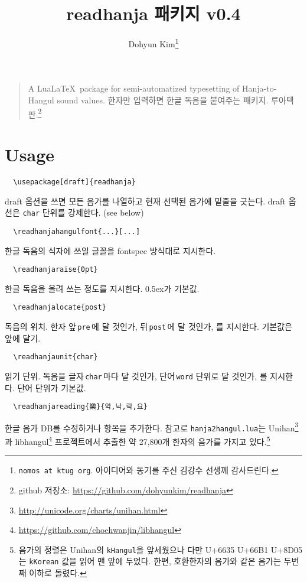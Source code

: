 \documentclass[b5paper]{article}
\begin{document}
\title{\ttfamily readhanja 패키지 v0.4}
\author{Dohyun Kim\thanks{\texttt{nomos at ktug org}.
  아이디어와 동기를 주신 김강수 선생께 감사드린다.}}
\maketitle

\begin{quote}
A Lua\LaTeX\ package for semi-automatized typesetting of
Hanja-to-Hangul sound values.
한자만 입력하면 한글 독음을 붙여주는 패키지. 루아텍 판.\footnote{
  github 저장소: \url{https://github.com/dohyunkim/readhanja}}
\end{quote}

\section*{Usage}

\begin{verbatim}
  \usepackage[draft]{readhanja}
\end{verbatim}
draft 옵션을 쓰면 모든 음가를 나열하고 현재 선택된 음가에
밑줄을 긋는다. draft 옵션은 \verb|char| 단위를 강제한다. (see below)

\begin{verbatim}
  \readhanjahangulfont{...}[...]
\end{verbatim}
한글 독음의 식자에 쓰일 글꼴을 fontspec 방식대로 지시한다.

\begin{verbatim}
  \readhanjaraise{0pt}
\end{verbatim}
한글 독음을 올려 쓰는 정도를 지시한다. 0.5ex가 기본값.

\begin{verbatim}
  \readhanjalocate{post}
\end{verbatim}
독음의 위치. 한자 앞\,\verb|pre|\,에 달 것인가, 뒤\,\verb|post|\,에 달 것인가, 를
지시한다.  기본값은 앞에 달기.

\begin{verbatim}
  \readhanjaunit{char}
\end{verbatim}
읽기 단위. 독음을 글자\,\verb|char|\,마다 달 것인가, 단어\,\verb|word| 단위로
달 것인가, 를 지시한다. 단어 단위가 기본값.

\begin{verbatim}
  \readhanjareading{樂}{악,낙,락,요}
\end{verbatim}
한글 음가 DB를 수정하거나 항목을 추가한다. 참고로 \verb|hanja2hangul.lua|는
Unihan\footnote{\url{http://unicode.org/charts/unihan.html}}과
libhangul\footnote{\url{https://github.com/choehwanjin/libhangul}}
프로젝트에서 추출한 약 27,800개 한자의 음가를
가지고 있다.\footnote{음가의 정렬은 Unihan의 \texttt{kHangul}을 앞세웠으나
  다만 \mbox{U+6635} \mbox{U+66B1} \mbox{U+8D05}는 \texttt{kKorean} 값을 읽어
  맨 앞에 두었다. 한편, 호환한자의 음가와 같은 음가는 두번째 이하로 돌렸다.}
\end{document}
